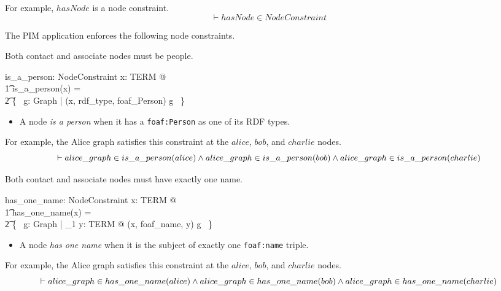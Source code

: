 \documentclass{article}
\begin{document}
For example, $hasNode$ is a node constraint.
\[\vdash
	hasNode \in NodeConstraint
\]

The PIM application enforces the following node constraints.

Both contact and associate nodes must be people.
\begin{axdef}
	is\_a\_person: NodeConstraint
\where
	\forall x: TERM @ \\
\t1		is\_a\_person(x) = \\
\t2		\{~ g: Graph | (x, rdf\_type, foaf\_Person) \in g ~\}
\end{axdef}
\begin{itemize}
\item A node {\em is a person} when it has a {\tt foaf:Person} as one of its RDF types.
\end{itemize}

For example, the Alice graph satisfies this constraint at the $alice$, $bob$, and $charlie$ nodes.
\[\vdash
	alice\_graph \in is\_a\_person(alice) \land \\
	alice\_graph \in is\_a\_person(bob) \land \\
	alice\_graph \in is\_a\_person(charlie)
\]

\cbstart
Both contact and associate nodes must have exactly one name.
\cbend
\begin{axdef}
	has\_one\_name: NodeConstraint
\where
	\forall x: TERM @ \\
\t1		has\_one\_name(x) = \\
\t2			\{~ g: Graph | \exists_1 y: TERM @ (x, foaf\_name, y) \in g ~\}
\end{axdef}
\begin{itemize}
\item A node {\em has one name} when it is the subject of exactly one {\tt foaf:name} triple.
\end{itemize}

For example, the Alice graph satisfies this constraint at the $alice$, $bob$, and $charlie$ nodes.
\[\vdash
	alice\_graph \in has\_one\_name(alice) \land \\
	alice\_graph \in has\_one\_name(bob) \land \\
	alice\_graph \in has\_one\_name(charlie)
\]
\end{document}
